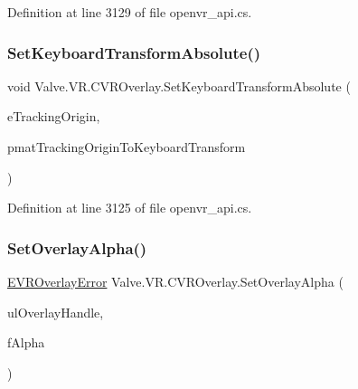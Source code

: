 Definition at line 3129 of file openvr\+\_\+api.\+cs.

\mbox{\label{class_valve_1_1_v_r_1_1_c_v_r_overlay_af389a27b7be568bcfac9d0682a57f47d}} 
\subsubsection{\texorpdfstring{SetKeyboardTransformAbsolute()}{SetKeyboardTransformAbsolute()}}
{\footnotesize\ttfamily void Valve.\+V\+R.\+C\+V\+R\+Overlay.\+Set\+Keyboard\+Transform\+Absolute (\begin{DoxyParamCaption}\item[{\mbox{\hyperlink{namespace_valve_1_1_v_r_a29be99a3c2f780157bd490db06a7f12f}{E\+Tracking\+Universe\+Origin}}}]{e\+Tracking\+Origin,  }\item[{ref \mbox{\hyperlink{struct_valve_1_1_v_r_1_1_hmd_matrix34__t}{Hmd\+Matrix34\+\_\+t}}}]{pmat\+Tracking\+Origin\+To\+Keyboard\+Transform }\end{DoxyParamCaption})}



Definition at line 3125 of file openvr\+\_\+api.\+cs.

\mbox{\label{class_valve_1_1_v_r_1_1_c_v_r_overlay_a813f1c421db4878560061db98e26d252}} 
\subsubsection{\texorpdfstring{SetOverlayAlpha()}{SetOverlayAlpha()}}
{\footnotesize\ttfamily \mbox{\hyperlink{namespace_valve_1_1_v_r_aaee5c5144f42b7969d45b854f51b0c18}{E\+V\+R\+Overlay\+Error}} Valve.\+V\+R.\+C\+V\+R\+Overlay.\+Set\+Overlay\+Alpha (\begin{DoxyParamCaption}\item[{ulong}]{ul\+Overlay\+Handle,  }\item[{float}]{f\+Alpha }\end{DoxyParamCaption})}



